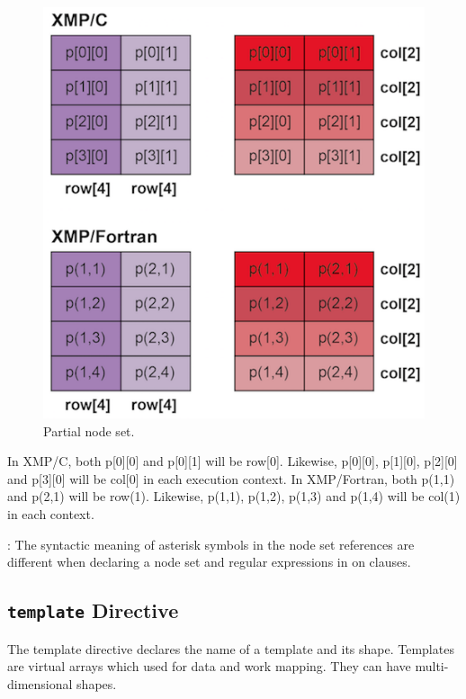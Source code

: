 \begin{figure}
  \centering
  \includegraphics{figs/row_col.png}
  \caption{Partial node set.}
  \label{fig:partial}
\end{figure}

In XMP/C, both p[0][0] and p[0][1] will be row[0]. Likewise, p[0][0],
p[1][0], p[2][0] and p[3][0] will be col[0] in each execution
context. In XMP/Fortran, both p(1,1) and p(2,1) will be
row(1). Likewise, p(1,1), p(1,2), p(1,3) and p(1,4) will be col(1) in
each context.

\noindent\hrulefill

: The syntactic meaning of asterisk symbols in the
node set references are different when declaring a node set and regular
expressions in on clauses.

\noindent\hrulefill






\subsection{{\tt template} Directive}

The template directive declares the name of a template and its
shape. Templates are virtual arrays which used for data and work
mapping. They can have multi-dimensional shapes.

